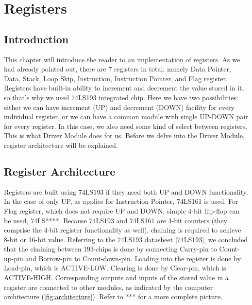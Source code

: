 \section{Registers}{\label{Registers Architecture}}
\subsection{Introduction}
This chapter will introduce the reader to an implementation of registers. As we had already pointed out, there are 7 registers in total; namely Data Pointer, Data, Stack, Loop Skip, Instruction, Instruction Pointer, and Flag register. Registers have built-in ability to increment and decrement the value stored in it, so that's why we used 74LS193 integrated chip. Here we have two possibilities: either we can have increment (UP) and decrement (DOWN) facility for every individual register, or we can have a common module with single UP-DOWN pair for every register. In this case, we also need some kind of select between registers. This is what Driver Module does for us. Before we delve into the Driver Module, register architecture will be explained.

\subsection{Register Architecture}
Registers are built using 74LS193 if they need both UP and DOWN functionality. In the case of only UP, as applies for Instruction Pointer, 74LS161 is used. For Flag register, which does not require UP and DOWN, simple 4-bit flip-flop can be used, 74LS****. Because 74LS193 and 74LS161 are 4-bit counters (they comprise the 4-bit register functionality as well), chaining is required to achieve 8-bit or 16-bit value. Referring to the 74LS193 datasheet \ref{74LS193}, we concluded that the chaining between 193-chips is done by connecting Carry-pin to Count-up-pin and Borrow-pin to Count-down-pin. Loading into the register is done by Load-pin, which is ACTIVE-LOW. Clearing is done by Clear-pin, which is ACTIVE-HIGH. Corresponding outputs and inputs of the stored value in a register are connected to other modules, as indicated by the computer architecture (\ref{fig:architecture}). Refer to *** for a more complete picture.

